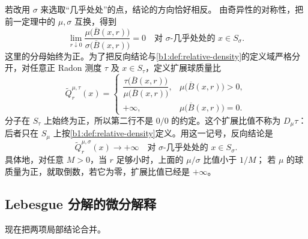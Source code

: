 若改用 \(\sigma\) 来选取“几乎处处”的点，结论的方向恰好相反。
由奇异性的对称性，把前一定理中的 \(\mu,\sigma\) 互换，得到
\[
 \lim_{r\downarrow0}
 \frac{\mu\bigl(\overline B(x,r)\bigr)}
      {\sigma\bigl(\overline B(x,r)\bigr)}=0
 \quad\text{对 }\sigma\text{-几乎处处的 }x\in S_\sigma.
\]
这里的分母始终为正。为了把反向结论与\cref{b1:def:relative-density}的定义域严格分开，对任意正 Radon 测度 \(\tau\) 及 \(x\in S_\tau\)，定义扩展球质量比
\[
 \widetilde Q_r^{\mu,\tau}(x)=
 \begin{cases}
 \dfrac{\tau\bigl(\overline B(x,r)\bigr)}
       {\mu\bigl(\overline B(x,r)\bigr)},
       &\mu\bigl(\overline B(x,r)\bigr)>0,\\[6pt]
 +\infty,&\mu\bigl(\overline B(x,r)\bigr)=0.
 \end{cases}
\]
分子在 \(S_\tau\) 上始终为正，所以第二行不是 \(0/0\) 的约定。这个扩展比值不称为 \(D_\mu\tau\)：后者只在 \(S_\mu\) 上按\cref{b1:def:relative-density}定义。用这一记号，反向结论是
\[
 \widetilde Q_r^{\mu,\sigma}(x)\longrightarrow+\infty
 \quad\text{对 }\sigma\text{-几乎处处的 }x\in S_\sigma.
\]
具体地，对任意 \(M>0\)，当 \(r\) 足够小时，上面的 \(\mu/\sigma\) 比值小于 \(1/M\)；
若 \(\mu\) 的球质量为正，就取倒数，若它为零，扩展比值已经是 \(+\infty\)。

\subsection{Lebesgue 分解的微分解释}
\label{b1:subsec:140304}

现在把两项局部结论合并。

